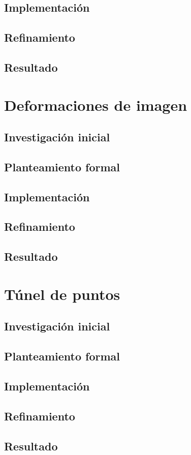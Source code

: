\subsection{Implementación}
\subsection{Refinamiento}
\subsection{Resultado}

\section{Deformaciones de imagen}

\subsection{Investigación inicial}
\subsection{Planteamiento formal}
\subsection{Implementación}
\subsection{Refinamiento}
\subsection{Resultado}

\section{Túnel de puntos}

\subsection{Investigación inicial}
\subsection{Planteamiento formal}
\subsection{Implementación}
\subsection{Refinamiento}
\subsection{Resultado}